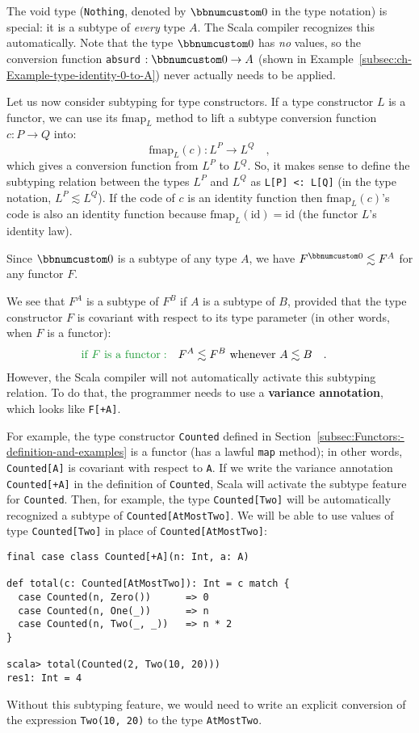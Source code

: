 The void type (\lstinline!Nothing!, denoted by $\bbnum 0$ in the
type notation) is special: it is a subtype of \emph{every}
type $A$. The Scala compiler recognizes this automatically. Note
that the type $\bbnum 0$ has \emph{no} values, so the conversion
function \lstinline!absurd! $:\bbnum 0\rightarrow A$ (shown in Example~\ref{subsec:ch-Example-type-identity-0-to-A})
never actually needs to be applied. 

Let us now consider subtyping for type constructors. If a type constructor
$L$ is a functor, we can use its $\text{fmap}_{L}$ method to lift
a subtype conversion function $c:P\rightarrow Q$ into:
\[
\text{fmap}_{L}(c):L^{P}\rightarrow L^{Q}\quad,
\]
which gives a conversion function from $L^{P}$ to $L^{Q}$. So, it
makes sense to define the subtyping relation between the types $L^{P}$
and $L^{Q}$ as \lstinline!L[P] <: L[Q]! (in the type notation, $L^{P}\lesssim L^{Q}$).
If the code of $c$ is an identity  function then $\text{fmap}_{L}(c)$\textsf{'}s
code is also an identity function because $\text{fmap}_{L}(\text{id})=\text{id}$
(the functor $L$\textsf{'}s identity law).

Since $\bbnum 0$ is a subtype of any type $A$, we have $F^{\bbnum 0}\lesssim F^{A}$
for any functor $F$.

We see that $F^{A}$ is a subtype
of $F^{B}$ if $A$ is a subtype of $B$, provided that the type constructor
$F$ is covariant with respect to its type parameter (in other words,
when $F$ is a functor):
\begin{align*}
{\color{greenunder}\text{if }F\text{ is a functor}:}\quad & F^{A}\lesssim F^{B}\text{ whenever }A\lesssim B\quad.
\end{align*}
However, the Scala compiler will not automatically activate this subtyping
relation. To do that, the programmer needs to use a \textbf{variance
annotation}, which looks like \lstinline!F[+A]!.

For example, the type constructor \lstinline!Counted! defined in
Section~\ref{subsec:Functors:-definition-and-examples} is a functor
(has a lawful \lstinline!map! method); in other words, \lstinline!Counted[A]!
is covariant with respect to \lstinline!A!. If we write the variance
annotation \lstinline!Counted[+A]! in the definition of \lstinline!Counted!,
Scala will activate the subtype feature for \lstinline!Counted!.
Then, for example, the type \lstinline!Counted[Two]! will be automatically
recognized a subtype of \lstinline!Counted[AtMostTwo]!. We will be
able to use values of type \lstinline!Counted[Two]! in place of \lstinline!Counted[AtMostTwo]!:
\begin{lstlisting}
final case class Counted[+A](n: Int, a: A)

def total(c: Counted[AtMostTwo]): Int = c match {
  case Counted(n, Zero())      => 0
  case Counted(n, One(_))      => n
  case Counted(n, Two(_, _))   => n * 2
}

scala> total(Counted(2, Two(10, 20)))
res1: Int = 4
\end{lstlisting}
Without this subtyping feature, we would need to write an explicit
conversion of the expression \lstinline!Two(10, 20)! to the type
\lstinline!AtMostTwo!.

